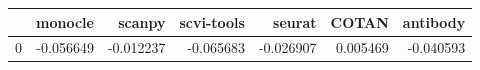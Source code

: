 \begin{tabular}{lrrrrrr}
\toprule
 & monocle & scanpy & scvi-tools & seurat & COTAN & antibody \\
\midrule
0 & -0.056649 & -0.012237 & -0.065683 & -0.026907 & 0.005469 & -0.040593 \\
\bottomrule
\end{tabular}
